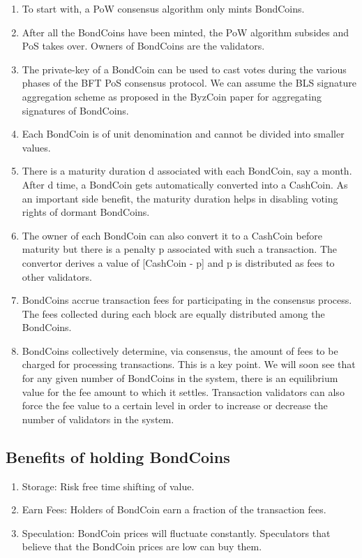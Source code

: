 \begin{enumerate}
    \item To start with, a PoW consensus algorithm only mints BondCoins.
    \item After all the BondCoins have been minted, the PoW algorithm subsides and PoS takes over. Owners of BondCoins are the validators.
    \item The private-key of a BondCoin can be used to cast votes during the various phases of the BFT PoS consensus protocol. We can assume the BLS signature aggregation scheme as proposed in the ByzCoin paper for aggregating signatures of BondCoins.
    \item Each BondCoin is of unit denomination and cannot be divided into smaller values.
    \item There is a maturity duration d associated with each BondCoin, say a month. After d time, a BondCoin gets automatically converted into a CashCoin. As an important side benefit, the maturity duration helps in disabling voting rights of dormant BondCoins.
    \item The owner of each BondCoin can also convert it to a CashCoin before maturity but there is a penalty p associated with such a transaction. The convertor derives a value of [CashCoin - p] and p is distributed as fees to other validators.
    \item BondCoins accrue transaction fees for participating in the consensus process. The fees collected during each block are equally distributed among the BondCoins.
    \item BondCoins collectively determine, via consensus, the amount of fees to be charged for processing transactions. This is a key point. We will soon see that for any given number of BondCoins in the system, there is an equilibrium value for the fee amount to which it settles. Transaction validators can also force the fee value to a certain level in order to increase or decrease the number of validators in the system.

\end{enumerate}

\subsection{Benefits of holding BondCoins}

\begin{enumerate}
    \item Storage: Risk free time shifting of value.
    \item Earn Fees: Holders of BondCoin earn a fraction of the transaction fees.
    \item Speculation: BondCoin prices will fluctuate constantly. Speculators that believe that the BondCoin prices are low can buy them.
\end{enumerate}


